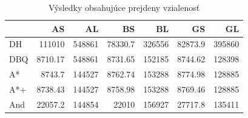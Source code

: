 \begin{table}[H]
	\centering
	\begin{tabular}{|l | r|r|r|r|r|r|}
	\hline
	 & AS & AL & BS & BL & GS & GL \\
	\hline
	DH & 111010 & 548861 & 78330.7& 326556 & 82873.9 & 395860 \\
	DBQ & 8710.17 & 548861 & 8731.65 & 152185 & 8744.62 & 128398 \\
	A* & 8743.7 & 144527& 8762.74 & 153288 & 8774.98 & 128885 \\
	A*+ & 8738.43& 144527 & 8758.98 & 153288 & 8769.46 & 128885 \\
	And & 22057.2 & 144854 & 22010 & 156927 & 27717.8 & 135411 \\
	\hline
	\end{tabular}
	\caption{Výsledky obsahujúce prejdeny vzialenosť}
	\label{fig:totalpath_result}
\end{table}

